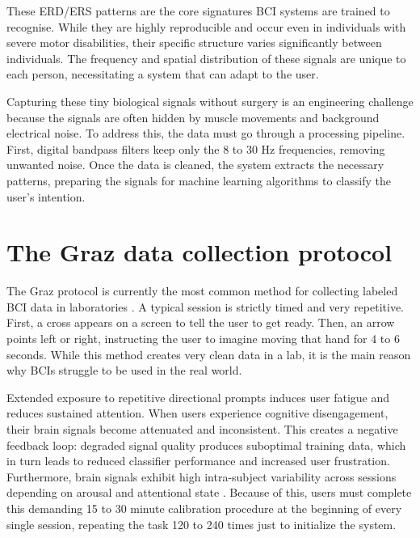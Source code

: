 \documentclass[a4paper, 11pt, openany]{report}
\let\cite\citep
\begin{document}
    These ERD/ERS patterns are the core signatures BCI systems are trained to 
    recognise. While they are highly reproducible and occur even in individuals 
    with severe motor disabilities, their specific structure varies significantly 
    between individuals. The frequency and spatial distribution 
    of these signals are unique to each person, necessitating a system that can 
    adapt to the user.

    Capturing these tiny biological signals without surgery is an engineering challenge 
    because the signals are often hidden by muscle movements and background electrical noise. 
    To address this, the data must go through a processing pipeline. First, digital bandpass 
    filters keep only the 8 to 30 Hz frequencies, removing unwanted noise. Once the data 
    is cleaned, the system extracts the necessary patterns, preparing the signals for machine 
    learning algorithms to classify the user's intention.
    



    \section{The Graz data collection protocol}
    The Graz protocol is currently the most common method for collecting labeled BCI data in 
    laboratories \cite{wolpaw2002brain, lotte2018review}. A typical session is strictly timed and very repetitive. First, a cross 
    appears on a screen to tell the user to get ready. Then, an arrow points left or right, 
    instructing the user to imagine moving that hand for 4 to 6 seconds. While this method 
    creates very clean data in a lab, it is the main reason why BCIs struggle to be used in 
    the real world.

    Extended exposure to repetitive directional prompts induces user fatigue and reduces sustained attention. 
    When users experience cognitive disengagement, their brain signals become attenuated and inconsistent. 
    This creates a negative feedback loop: degraded signal quality produces suboptimal training data, 
    which in turn leads to reduced classifier performance and increased user frustration. Furthermore, brain 
    signals exhibit high intra-subject variability across sessions depending on arousal and attentional state \cite{giles2022transfer}. 
    Because of this, users must complete this demanding 15 to 30 minute calibration procedure at the beginning 
    of every single session, repeating the task 120 to 240 times just to initialize the system.
\end{document}
